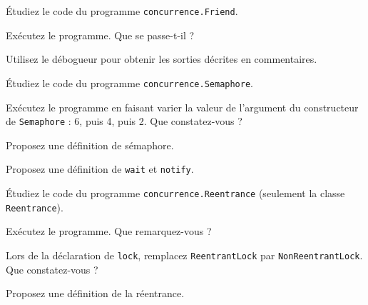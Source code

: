 \documentclass{td}
\begin{document}

\begin{exercice}[Vivacité]

  Étudiez le code du programme \texttt{concurrence.Friend}.
  
  \begin{question} 
  \item Exécutez le programme. Que se passe-t-il ?
  \item Utilisez le débogueur pour obtenir les sorties décrites en commentaires.
  \end{question}

\end{exercice}


\begin{exercice}[Moniteurs]

  Étudiez le code du programme \texttt{concurrence.Semaphore}.

  \begin{question} 
  \item Exécutez le programme en faisant varier la valeur de l'argument du constructeur de \lstinline{Semaphore} : 6, puis 4, puis 2. Que constatez-vous ?
  \item Proposez une définition de sémaphore.
  \item Proposez une définition de \lstinline{wait} et \lstinline{notify}.
  \end{question}

\end{exercice}


\begin{exercice}[Réentrance]

  Étudiez le code du programme \texttt{concurrence.Reentrance} (seulement la classe \texttt{Reentrance}).

  \begin{question} 
  \item Exécutez le programme. Que remarquez-vous ?
  \item Lors de la déclaration de \lstinline{lock}, remplacez \lstinline{ReentrantLock} par \lstinline{NonReentrantLock}. Que constatez-vous ?
  \item Proposez une définition de la réentrance.
  \end{question}

\end{exercice}
\end{document}
